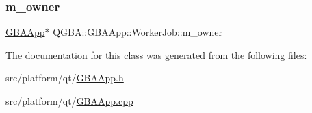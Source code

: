 \subsubsection{\texorpdfstring{m\+\_\+owner}{m\_owner}}
{\footnotesize\ttfamily \mbox{\hyperlink{class_q_g_b_a_1_1_g_b_a_app}{G\+B\+A\+App}}$\ast$ Q\+G\+B\+A\+::\+G\+B\+A\+App\+::\+Worker\+Job\+::m\+\_\+owner\hspace{0.3cm}{\ttfamily [private]}}



The documentation for this class was generated from the following files\+:\begin{DoxyCompactItemize}
\item 
src/platform/qt/\mbox{\hyperlink{_g_b_a_app_8h}{G\+B\+A\+App.\+h}}\item 
src/platform/qt/\mbox{\hyperlink{_g_b_a_app_8cpp}{G\+B\+A\+App.\+cpp}}\end{DoxyCompactItemize}
